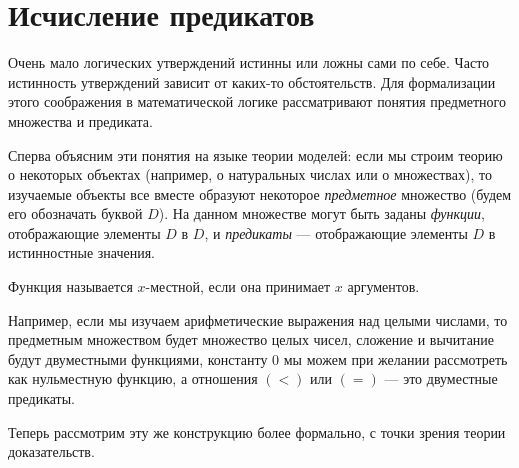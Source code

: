 \newtheorem*{note}{Примечание}

\section{Исчисление предикатов}

Очень мало логических утверждений истинны или ложны сами по себе.
Часто истинность утверждений зависит от каких-то обстоятельств.
Для формализации этого соображения в математической логике рассматривают
понятия предметного множества и предиката.

Сперва объясним эти понятия на языке теории моделей:
если мы строим теорию о некоторых объектах (например, о натуральных 
числах или о множествах), то изучаемые объекты все вместе образуют 
некоторое \emph{предметное} множество (будем его обозначать буквой $D$). 
На данном множестве могут быть заданы \emph{функции}, отображающие элементы
$D$ в $D$, и \emph{предикаты} --- отображающие элементы $D$ в 
истинностные значения.

\begin{definition}
Функция называется $x$-местной, если она принимает $x$ аргументов.
\end{definition}

Например, если мы изучаем арифметические выражения над целыми числами, 
то предметным множеством будет множество целых чисел, сложение и 
вычитание будут двуместными функциями, константу $0$ мы можем при желании
рассмотреть как нульместную функцию, а отношения $(<)$ или $(=)$ ---
это двуместные предикаты.

Теперь рассмотрим эту же конструкцию более формально, с точки зрения теории 
доказательств.

